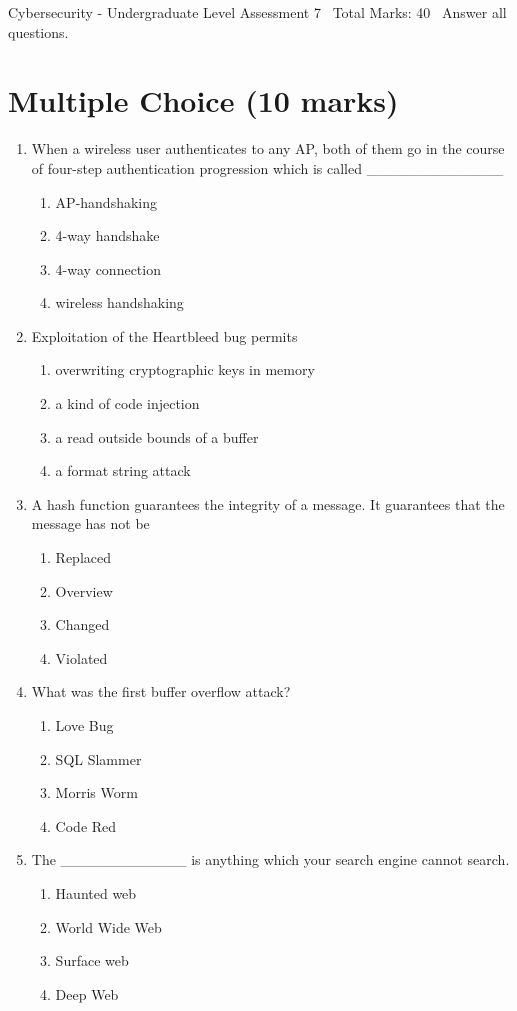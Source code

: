 \documentclass[12pt]{article}
\begin{document}
\begin{center}
Cybersecurity - Undergraduate Level Assessment 7 \
Total Marks: 40 \
Answer all questions.
\end{center}

\section*{Multiple Choice (10 marks)}
\begin{enumerate}[label=\arabic*.]
\item When a wireless user authenticates to any AP, both of them go in the course of four-step authentication progression which is called \_\_\_\_\_\_\_\_\_\_\_\_\_
\begin{enumerate}[label=(\alph*)]
    \item AP-handshaking
    \item 4-way handshake
    \item 4-way connection
    \item wireless handshaking
\end{enumerate}
\item Exploitation of the Heartbleed bug permits
\begin{enumerate}[label=(\alph*)]
    \item overwriting cryptographic keys in memory
    \item a kind of code injection
    \item a read outside bounds of a buffer
    \item a format string attack
\end{enumerate}
\item A hash function guarantees the integrity of a message. It guarantees that the message has not be
\begin{enumerate}[label=(\alph*)]
    \item Replaced
    \item Overview
    \item Changed
    \item Violated
\end{enumerate}
\item What was the first buffer overflow attack?
\begin{enumerate}[label=(\alph*)]
    \item Love Bug
    \item SQL Slammer
    \item Morris Worm
    \item Code Red
\end{enumerate}
\item The \_\_\_\_\_\_\_\_\_\_\_\_ is anything which your search engine cannot search.
\begin{enumerate}[label=(\alph*)]
    \item Haunted web
    \item World Wide Web
    \item Surface web
    \item Deep Web
\end{enumerate}
\end{enumerate}
\end{document}
